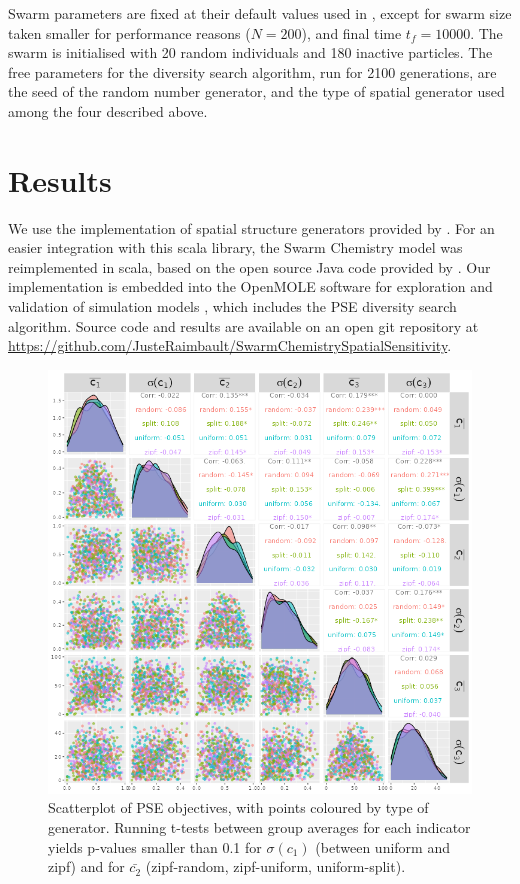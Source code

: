 \documentclass[letterpaper]{article}
\begin{document}
Swarm parameters are fixed at their default values used in \citep{sayama2018seeking}, except for swarm size taken smaller for performance reasons ($N=200$), and final time $t_f = 10000$. The swarm is initialised with 20 random individuals and 180 inactive particles. The free parameters for the diversity search algorithm, run for 2100 generations, are the seed of the random number generator, and the type of spatial generator used among the four described above.

\section{Results}

We use the implementation of spatial structure generators provided by \citep{raimbault2020scala}. For an easier integration with this scala library, the Swarm Chemistry model was reimplemented in scala, based on the open source Java code provided by \citep{sayama2018seeking}. Our implementation is embedded into the OpenMOLE software for exploration and validation of simulation models \citep{reuillon2013openmole}, which includes the PSE diversity search algorithm. Source code and results are available on an open git repository at \url{https://github.com/JusteRaimbault/SwarmChemistrySpatialSensitivity}.


\begin{figure}
    \centering
    \includegraphics[width=\linewidth]{pse-scatterplot_colorGenerator.png}
    \caption{Scatterplot of PSE objectives, with points coloured by type of generator. Running t-tests between group averages for each indicator yields p-values smaller than 0.1 for $\sigma(c_1)$ (between uniform and zipf) and for $\bar{c_2}$ (zipf-random, zipf-uniform, uniform-split).}
    \label{fig:pse}
\end{figure}
\end{document}
